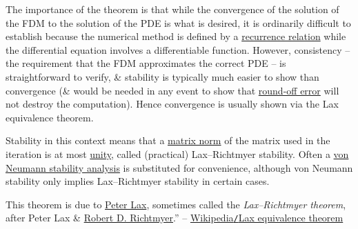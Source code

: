 \documentclass{article}
\begin{document}
The importance of the theorem is that while the convergence of the solution of the FDM to the solution of the PDE is what is desired, it is ordinarily difficult to establish because the numerical method is defined by a \href{https://en.wikipedia.org/wiki/Recurrence_relation}{recurrence relation} while the differential equation involves a differentiable function. However, consistency -- the requirement that the FDM approximates the correct PDE -- is straightforward to verify, \& stability is typically much easier to show than convergence (\& would be needed in any event to show that \href{https://en.wikipedia.org/wiki/Round-off_error}{round-off error} will not destroy the computation). Hence convergence is usually shown via the Lax equivalence theorem.

Stability in this context means that a \href{https://en.wikipedia.org/wiki/Matrix_norm}{matrix norm} of the matrix used in the iteration is at most \href{https://en.wikipedia.org/wiki/Unity_(mathematics)}{unity}, called (practical) Lax--Richtmyer stability. Often a \href{https://en.wikipedia.org/wiki/Von_Neumann_stability_analysis}{von Neumann stability analysis} is substituted for convenience, although von Neumann stability only implies Lax--Richtmyer stability in certain cases.

This theorem is due to \href{https://en.wikipedia.org/wiki/Peter_Lax}{\sc Peter Lax}, sometimes called the {\it Lax--Richtmyer theorem}, after {\sc Peter Lax} \& \href{https://en.wikipedia.org/wiki/Robert_D._Richtmyer}{\sc Robert D. Richtmyer}.'' -- \href{https://en.wikipedia.org/wiki/Lax_equivalence_theorem}{Wikipedia{\tt/}Lax equivalence theorem}

\end{document}
